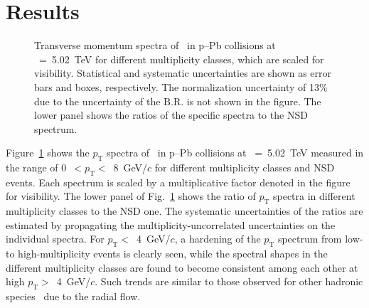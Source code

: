 
\section {Results}
\label{sec:results}

\begin{figure}[!hbt]
	\centering
	\caption{ Transverse momentum spectra of \fzero~in p--Pb collisions at \snn~=~5.02~TeV for different multiplicity classes, which are scaled for visibility. Statistical and systematic uncertainties are shown as error bars and boxes, respectively. The normalization uncertainty of 13\% due to the uncertainty of the $\mathrm{B.R.}$ is not shown in the figure. The lower panel shows the ratios of the specific spectra to the NSD spectrum. }
	\label{fig:pt}
\end{figure}

Figure~\ref{fig:pt} shows the $p_{\mathrm{T}}$ spectra of \fzero~in p--Pb collisions at \snn~=~5.02~TeV measured in the range of 0~$<p_{\mathrm{T}}<$~8~GeV/$c$ for different multiplicity classes and NSD events. Each spectrum is scaled by a multiplicative factor denoted in the figure for visibility. The lower panel of Fig.~\ref{fig:pt} shows the ratio of $p_{\mathrm{T}}$ spectra in different multiplicity classes to the NSD one. The systematic uncertainties of the ratios are estimated by propagating the multiplicity-uncorrelated uncertainties on the individual spectra. For $p_{\mathrm{T}}<$~4~GeV/$c$, a hardening of the $p_{\mathrm{T}}$ spectrum from low- to high-multiplicity events is clearly seen, while the spectral shapes in the different multiplicity classes are found to become consistent among each other at high $p_{\mathrm{T}}>$~4~GeV/$c$. Such trends are similar to those observed for other hadronic species~\cite{Tsallis:1987eu} due to the radial flow.

